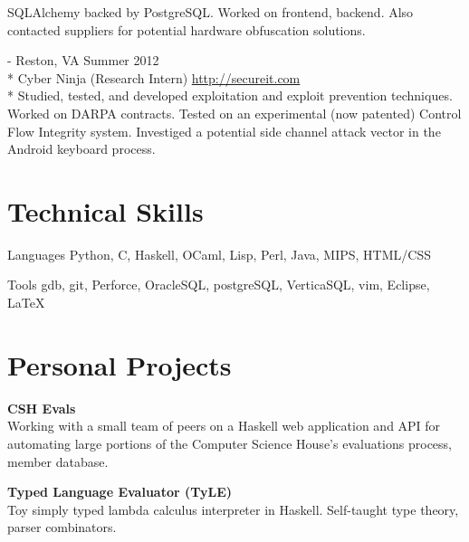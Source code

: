 \documentclass[letter,margin,line]{resume}
\newcommand{\rurl}[1]{\hfill {\footnotesize \url{#1}}}
\newcommand{\rdate}[1]{\hfill {\small #1}}
\renewcommand{\employer}[6]{\item[#1] - #2 \rdate{#3} \\* #4 \rurl{#5}\\* #6}
\newcommand{\project}[2]{\item {\bf #1}\\{\small #2}\\}
\begin{document}
\begin{resume}
\begin{asparadesc}
{                      SQLAlchemy backed by PostgreSQL.
                      Worked on frontend, backend. Also contacted suppliers
                      for potential hardware obfuscation solutions.
                     }\\
            \employer{SecureIT}
                     {Reston, VA}
                     {Summer 2012}
                     {Cyber Ninja (Research Intern)}
                     {http://secureit.com}
                     {Studied, tested, and developed exploitation and
                      exploit prevention techniques.
                      Worked on DARPA contracts. 
                      Tested on an experimental (now patented)
                      Control Flow Integrity system.
                      Investiged a potential side channel attack vector
                      in the Android keyboard process.
                     }
        \end{asparadesc}

        \section{\mysidestyle Technical Skills}
        \begin{compactdesc}
        \item[Languages] { \small
                 Python,
                 C,
                 Haskell,
                 OCaml,
                 Lisp,
                 Perl,
                 Java,
                 MIPS,
                 HTML/CSS
            }
        \item[Tools] { \small
                gdb,
                git,
                Perforce,
                OracleSQL,
                postgreSQL,
                VerticaSQL,
                vim,
                Eclipse,
                \LaTeX
            }
        \end{compactdesc}
        \section{\mysidestyle Personal Projects}
        \begin{asparablank}
            \project{CSH Evals}
            {
                Working with a small team of peers on a Haskell web application
                and API for automating large portions of the Computer Science
                House's evaluations process, member database.
            }
            \project{Typed Language Evaluator (TyLE)}
            {
                Toy simply typed lambda calculus interpreter in Haskell.
                Self-taught type theory, parser combinators.
            }
        \end{asparablank}

\end{resume}
\end{document}
